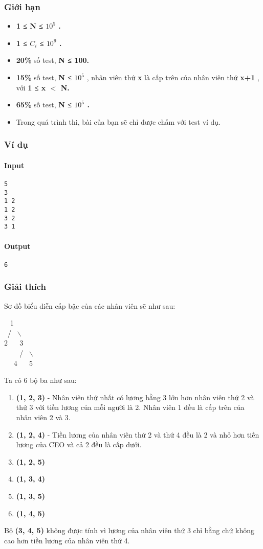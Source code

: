 \subsubsection{Giới hạn}
\begin{itemize}
	\item \textbf{1 ≤ N ≤ $10^{5}$ . }
	\item \textbf{1 ≤ $C_{i}$ ≤ $10^{9}$ . }
	\item \textbf{20\% } số test, \textbf{ N ≤ 100. }
	\item \textbf{15\% } số test, \textbf{ N ≤ $10^{5}$} , nhân viên thứ \textbf{ x } là cấp trên của nhân viên thứ \textbf{ x+1 } , với \textbf{ 1 ≤ x $<$ N. }
	\item \textbf{65\% } số test, \textbf{ N ≤ $10^{5}$ . }
	\item Trong quá trình thi, bài của bạn sẽ chỉ được chấm với test ví dụ.
\end{itemize}

\subsubsection{Ví dụ}

\paragraph{Input}
\begin{verbatim}
5
3
1 2
1 2
3 2
3 1\end{verbatim}

\paragraph{Output}
\begin{verbatim}
6\end{verbatim}

\subsubsection{Giải thích}

Sơ đồ biểu diễn cấp bậc của các nhân viên sẽ như sau:

  1
\\ /  $\backslash$
\\2    3
\\     /  $\backslash$
\\   4    5

Ta có 6 bộ ba như sau:
\begin{enumerate}
	\item \textbf{(1, 2, 3) } - Nhân viên thứ nhất có lương bằng 3 lớn hơn nhân viên thứ 2 và thứ 3 với tiền lương của mỗi người là 2. Nhân viên 1 đều là cấp trên của nhân viên 2 và 3.
	\item \textbf{(1, 2, 4) } - Tiền lương của nhân viên thứ 2 và thứ 4 đều là 2 và nhỏ hơn tiền lương của CEO và cả 2 đều là cấp dưới.
	\item \textbf{(1, 2, 5) }
	\item \textbf{(1, 3, 4) }
	\item \textbf{(1, 3, 5) }
	\item \textbf{(1, 4, 5) }
\end{enumerate}

Bộ \textbf{ (3, 4, 5) } không được tính vì lương của nhân viên thứ 3 chỉ bằng chứ không cao hơn tiền lương của nhân viên thứ 4.
